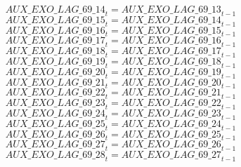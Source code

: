 \begin{dmath}
{AUX\_EXO\_LAG\_69\_14}_{t}={AUX\_EXO\_LAG\_69\_13}_{t-1}
\end{dmath}
\begin{dmath}
{AUX\_EXO\_LAG\_69\_15}_{t}={AUX\_EXO\_LAG\_69\_14}_{t-1}
\end{dmath}
\begin{dmath}
{AUX\_EXO\_LAG\_69\_16}_{t}={AUX\_EXO\_LAG\_69\_15}_{t-1}
\end{dmath}
\begin{dmath}
{AUX\_EXO\_LAG\_69\_17}_{t}={AUX\_EXO\_LAG\_69\_16}_{t-1}
\end{dmath}
\begin{dmath}
{AUX\_EXO\_LAG\_69\_18}_{t}={AUX\_EXO\_LAG\_69\_17}_{t-1}
\end{dmath}
\begin{dmath}
{AUX\_EXO\_LAG\_69\_19}_{t}={AUX\_EXO\_LAG\_69\_18}_{t-1}
\end{dmath}
\begin{dmath}
{AUX\_EXO\_LAG\_69\_20}_{t}={AUX\_EXO\_LAG\_69\_19}_{t-1}
\end{dmath}
\begin{dmath}
{AUX\_EXO\_LAG\_69\_21}_{t}={AUX\_EXO\_LAG\_69\_20}_{t-1}
\end{dmath}
\begin{dmath}
{AUX\_EXO\_LAG\_69\_22}_{t}={AUX\_EXO\_LAG\_69\_21}_{t-1}
\end{dmath}
\begin{dmath}
{AUX\_EXO\_LAG\_69\_23}_{t}={AUX\_EXO\_LAG\_69\_22}_{t-1}
\end{dmath}
\begin{dmath}
{AUX\_EXO\_LAG\_69\_24}_{t}={AUX\_EXO\_LAG\_69\_23}_{t-1}
\end{dmath}
\begin{dmath}
{AUX\_EXO\_LAG\_69\_25}_{t}={AUX\_EXO\_LAG\_69\_24}_{t-1}
\end{dmath}
\begin{dmath}
{AUX\_EXO\_LAG\_69\_26}_{t}={AUX\_EXO\_LAG\_69\_25}_{t-1}
\end{dmath}
\begin{dmath}
{AUX\_EXO\_LAG\_69\_27}_{t}={AUX\_EXO\_LAG\_69\_26}_{t-1}
\end{dmath}
\begin{dmath}
{AUX\_EXO\_LAG\_69\_28}_{t}={AUX\_EXO\_LAG\_69\_27}_{t-1}
\end{dmath}
